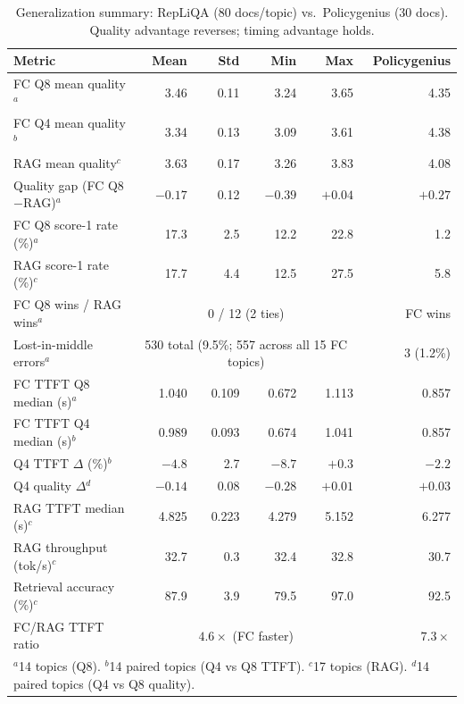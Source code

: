 \documentclass{article}
\begin{document}
\begin{table}[t]
\centering
\caption{Generalization summary: RepLiQA (80 docs/topic) vs.\
Policygenius (30 docs). Quality advantage reverses; timing advantage holds.}
\label{tab:generalization}
\begin{tabular}{lrrrr|r}
\toprule
\textbf{Metric} & \textbf{Mean} & \textbf{Std} & \textbf{Min} & \textbf{Max} & \textbf{Policygenius} \\
\midrule
FC Q8 mean quality$^a$       & 3.46 & 0.11 & 3.24 & 3.65 & 4.35 \\
FC Q4 mean quality$^b$       & 3.34 & 0.13 & 3.09 & 3.61 & 4.38 \\
RAG mean quality$^c$         & 3.63 & 0.17 & 3.26 & 3.83 & 4.08 \\
Quality gap (FC Q8$-$RAG)$^a$ & $-0.17$ & 0.12 & $-0.39$ & $+0.04$ & $+0.27$ \\
FC Q8 score-1 rate (\%)$^a$  & 17.3 & 2.5 & 12.2 & 22.8 & 1.2 \\
RAG score-1 rate (\%)$^c$    & 17.7 & 4.4 & 12.5 & 27.5 & 5.8 \\
FC Q8 wins / RAG wins$^a$    & \multicolumn{4}{c}{0 / 12 (2 ties)} & FC wins \\
Lost-in-middle errors$^a$    & \multicolumn{4}{c}{530 total (9.5\%; 557 across all 15 FC topics)} & 3 (1.2\%) \\
\midrule
FC TTFT Q8 median (s)$^a$    & 1.040 & 0.109 & 0.672 & 1.113 & 0.857 \\
FC TTFT Q4 median (s)$^b$    & 0.989 & 0.093 & 0.674 & 1.041 & 0.857 \\
Q4 TTFT $\Delta$ (\%)$^b$    & $-4.8$ & 2.7 & $-8.7$ & $+0.3$ & $-2.2$ \\
Q4 quality $\Delta$$^d$       & $-0.14$ & 0.08 & $-0.28$ & $+0.01$ & $+0.03$ \\
\midrule
RAG TTFT median (s)$^c$      & 4.825 & 0.223 & 4.279 & 5.152 & 6.277 \\
RAG throughput (tok/s)$^c$   & 32.7  & 0.3   & 32.4  & 32.8  & 30.7 \\
Retrieval accuracy (\%)$^c$  & 87.9  & 3.9   & 79.5  & 97.0  & 92.5 \\
FC/RAG TTFT ratio            & \multicolumn{4}{c}{$4.6\times$ (FC faster)} & $7.3\times$ \\
\bottomrule
\multicolumn{6}{l}{\footnotesize $^a$14 topics (Q8). \quad $^b$14 paired topics (Q4 vs Q8 TTFT). \quad $^c$17 topics (RAG). \quad $^d$14 paired topics (Q4 vs Q8 quality).}
\end{tabular}
\end{table}
\end{document}
